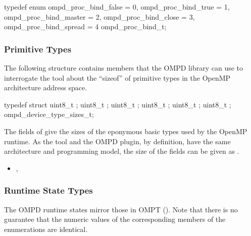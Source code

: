 \format

\begin{ccppspecific}
\begin{ompSyntax}
typedef enum {
  ompd_proc_bind_false = 0,
  ompd_proc_bind_true = 1,
  ompd_proc_bind_master = 2,
  ompd_proc_bind_close = 3,
  ompd_proc_bind_spread = 4
} ompd_proc_bind_t;
\end{ompSyntax}
\end{ccppspecific}


\subsubsection{Primitive Types}
\label{subsubsec:ompd_device_type_sizes_t}
The following structure contains members that the OMPD library can use
to interrogate the tool about the ``sizeof'' of primitive types in the OpenMP architecture 
address space.

\format

\begin{ccppspecific}
\begin{ompSyntax}
typedef struct {
  uint8_t ;
  uint8_t ;
  uint8_t ;
  uint8_t ;
  uint8_t ;
  uint8_t ;
} ompd_device_type_sizes_t;
\end{ompSyntax}
\end{ccppspecific}


\descr
The fields of  give the sizes of
the eponymous basic types used by the OpenMP runtime.
As the tool and the OMPD plugin, by definition, have the same
architecture and programming model, the size of the fields can be given
as .

\crossreferences
\begin{itemize}
	\item
	, 
\end{itemize}

\subsubsection{Runtime State Types}

The OMPD runtime states mirror those in OMPT (). Note that there is no guarantee that 
the numeric values of the corresponding members of the enumerations are identical.

\format

